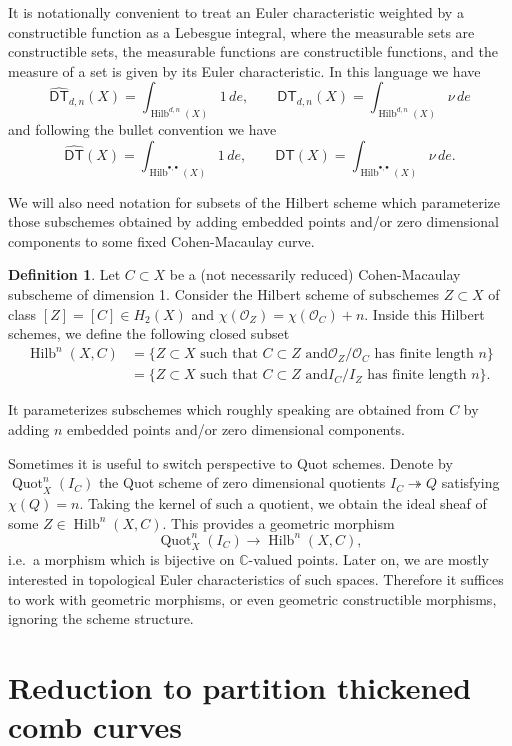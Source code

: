 \documentclass[12pt]{amsart}
\theoremstyle{definition}
\newtheorem{definition}[theorem]{Definition}
\newcommand{\CC} {\mathbb{C}}          %
\renewcommand{\O}{\mathcal{O}}
\newcommand{\Hilb}{\operatorname{Hilb}}
\newcommand{\Quot}{\operatorname{Quot}}
\newcommand{\DT}{\mathsf{DT}}
\newcommand{\DThat}{\widehat{\DT}}
\newcommand{\presectionspace}{\vspace{0.2cm}} %
\begin{document}
It is notationally convenient to treat an Euler characteristic
weighted by a constructible function as a Lebesgue integral, where the
measurable sets are constructible sets, the measurable functions are
constructible functions, and the measure of a set is given by its
Euler characteristic. In this language we have
\[
\DThat_{d ,n}(X) =  \int_{\Hilb^{d ,n}(X)} 1\, de, \quad \quad
\DT_{d ,n}(X) = \int_{\Hilb^{d ,n}(X)} \nu \, de
\]
and following the bullet convention we have
\[
\DThat(X) =  \int_{\Hilb^{\bullet ,\bullet }(X)} 1\, de, \quad \quad
\DT(X) = \int_{\Hilb^{\bullet ,\bullet }(X)} \nu \, de.
\]

We will also need notation for subsets of the Hilbert scheme which
parameterize those subschemes obtained by adding embedded points
and/or zero dimensional components to
some fixed Cohen-Macaulay curve.

\begin{definition}\label{defn: Hilb(U,C)}
Let $C\subset X$ be a (not necessarily reduced)
Cohen-Macaulay subscheme of dimension 1. Consider the Hilbert scheme 
of subschemes $Z \subset X$ of class $[Z] = [C] \in H_2(X)$ and 
$\chi(\O_Z) = \chi(\O_C)+n$. Inside this Hilbert schemes, we define the 
following closed subset
\begin{align*}
\Hilb^{n}(X,C) &= \{Z\subset X \text{ such that }C\subset Z\text{ and
$\O_{Z}/\O_{C}$ has finite length $n$} \} \\
&= \{Z\subset X \text{ such that }C\subset Z\text{ and
$I_{C}/I_{Z}$ has finite length $n$} \}.
\end{align*}
\end{definition}
It parameterizes subschemes
which roughly speaking are obtained from $C$ by adding $n$ embedded
points and/or zero dimensional components. 

Sometimes it is useful to switch perspective to Quot schemes. Denote by 
$\Quot_X^n(I_C)$ the Quot scheme of zero dimensional quotients 
$I_C \twoheadrightarrow Q$ satisfying $\chi(Q)=n$. Taking the kernel 
of such a quotient, we obtain the ideal sheaf of some $Z \in \Hilb^{n}(X,C)$. 
This provides a geometric morphism
$$
\Quot_X^n(I_C) \rightarrow \Hilb^n(X,C),
$$
i.e.~a morphism which is bijective on $\CC$-valued points. Later on, we are 
mostly interested in topological Euler characteristics of such spaces. Therefore 
it suffices to work with geometric morphisms, or even geometric constructible 
morphisms, ignoring the scheme structure.

\presectionspace
\section{Reduction to partition thickened comb curves}\label{sec: reduction to thickened comb curves}
\end{document}
